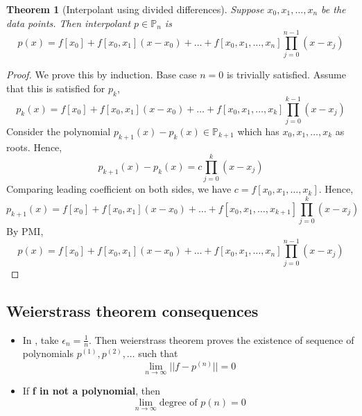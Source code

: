 \documentclass{article}
\newtheorem*{theorem}{Theorem}
\begin{document}
	\begin{theorem}[Interpolant using divided differences]
		Suppose $x_0,x_1,\hdots,x_n$ be the data points. Then interpolant $p \in \mathbb{P}_n$ is
		\[\boxed{p(x)=f[x_0]+f[x_0,x_1](x-x_0)+ \hdots +f[x_0,x_1,\hdots,x_n] \prod_{j=0}^{n-1}(x-x_j)}\]
	\end{theorem}

	\begin{proof}
		We prove this by induction. Base case $n=0$ is trivially satisfied.
		Assume that this is satisfied for $p_{k}$,
		\[p_k(x)=f[x_0]+f[x_0,x_1](x-x_0)+ \hdots +f[x_0,x_1,\hdots,x_k] \prod_{j=0}^{k-1}(x-x_j)\]
		Consider the polynomial $p_{k+1}(x)-p_k(x) \in \mathbb{P}_{k+1}$ which has $x_0,x_1,\hdots,x_k$ as roots. Hence,
		\[p_{k+1}(x)-p_k(x) = c\prod_{j=0}^k(x-x_j)\]
		Comparing leading coefficient on both sides, we have $c=f[x_0,x_1,\hdots,x_k]$. Hence,
		\[p_{k+1}(x)=f[x_0]+f[x_0,x_1](x-x_0)+ \hdots +f[x_0,x_1,\hdots,x_{k+1}] \prod_{j=0}^{k}(x-x_j)\]
		By PMI,
		\[p(x)=f[x_0]+f[x_0,x_1](x-x_0)+ \hdots +f[x_0,x_1,\hdots,x_n] \prod_{j=0}^{n-1}(x-x_j)\]
	\end{proof}




\subsection{Weierstrass theorem consequences}
\begin{itemize}
	\item In , take $\epsilon_n = \frac{1}{n}$. Then weierstrass theorem proves the existence of sequence of polynomials $p^{(1)}, p^{(2)}, \hdots$ such that 
		\[\lim_{n\rightarrow \infty} ||f-p^{(n)}||=0\]
	\item If \textbf{f in not a polynomial}, then 
		\[\lim_{n\rightarrow \infty} \text{degree of }p{(n)} = 0\]
\end{itemize}
\end{document}
